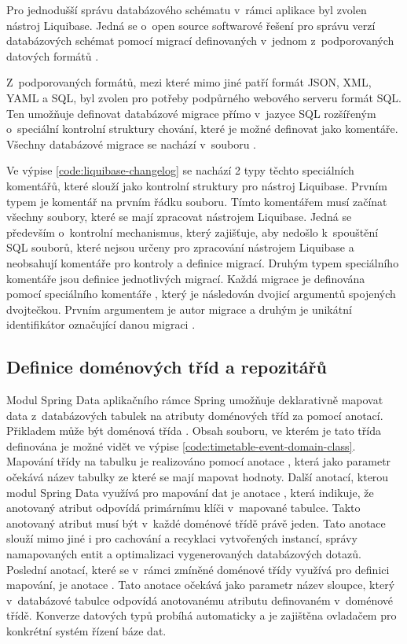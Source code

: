 Pro jednodušší správu databázového schématu v~rámci aplikace byl zvolen nástroj Liquibase. Jedná se o~open source softwarové řešení pro správu verzí databázových schémat pomocí migrací definovaných v~jednom z~podporovaných datových formátů \cite{liquibase_inc_2023}.

Z~podporovaných formátů, mezi které mimo jiné patří formát JSON, XML, YAML a SQL, byl zvolen pro potřeby podpůrného webového serveru formát SQL. Ten umožňuje definovat databázové migrace přímo v~jazyce SQL rozšířeným o~speciální kontrolní struktury chování, které je možné definovat jako komentáře. Všechny databázové migrace se nachází v~souboru .


Ve výpise \ref{code:liquibase-changelog} se nachází 2 typy těchto speciálních komentářů, které slouží jako kontrolní struktury pro nástroj Liquibase. Prvním typem je komentář  na prvním řádku souboru. Tímto komentářem musí začínat všechny soubory, které se mají zpracovat nástrojem Liquibase. Jedná se především o~kontrolní mechanismus, který zajišťuje, aby nedošlo k~spouštění SQL souborů, které nejsou určeny pro zpracování nástrojem Liquibase a neobsahují komentáře pro kontroly a definice migrací. Druhým typem speciálního komentáře jsou definice jednotlivých migrací. Každá migrace je definována pomocí speciálního komentáře , který je následován dvojicí argumentů spojených dvojtečkou. Prvním argumentem je autor migrace a druhým je unikátní identifikátor označující danou migraci \cite{liquibase_inc_sql_changelog}.

\subsection{Definice doménových tříd a repozitářů}

Modul Spring Data aplikačního rámce Spring umožňuje deklarativně mapovat data z~databázových tabulek na atributy doménových tříd za pomocí anotací. Přikladem může být doménová třída . Obsah souboru, ve kterém je tato třída definována je možné vidět ve výpise \ref{code:timetable-event-domain-class}. Mapování třídy na tabulku je realizováno pomocí anotace , která jako parametr očekává název tabulky ze které se mají mapovat hodnoty. Další anotací, kterou modul Spring Data využívá pro mapování dat je anotace , která indikuje, že anotovaný atribut odpovídá primárnímu klíči v~mapované tabulce. Takto anotovaný atribut musí být v~každé doménové třídě právě jeden. Tato anotace slouží mimo jiné i pro cachování a recyklaci vytvořených instancí, správy namapovaných entit a optimalizaci vygenerovaných databázových dotazů. Poslední anotací, které se v~rámci zmíněné doménové třídy využívá pro definici mapování, je anotace . Tato anotace očekává jako parametr název sloupce, který v~databázové tabulce odpovídá anotovanému atributu definovaném v~doménové třídě. Konverze datových typů probíhá automaticky a je zajištěna ovladačem pro konkrétní systém řízení báze dat.

